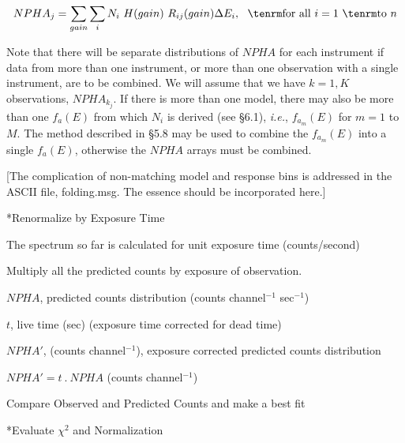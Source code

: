 $$NPHA_j = \sum_{gain} \sum_{i} N_i~H(gain)~R_{ij}(gain) \Delta E_i, ~~{\rm
for~all}~i=1~{\rm to}~n$$

{\list

Note that there will be separate distributions of $NPHA$ for each
instrument if data from more than one instrument, or more than one
observation with a single instrument, are to be combined.
We will assume that we have $k=1,K$ observations, $NPHA_{k_j}$.
If there is more than one model, there may also be more than one
$f_a(E)$ from which $N_i$ is derived (see \S 6.1), {\it i.e.},
$f_{a_m}(E)$ for $m=1$ to $M$.  The method described in \S5.8 may be used to combine
the $f_{a_m}(E)$ into a single $f_a(E)$, otherwise the
$NPHA$ arrays must be combined.

[The complication of non-matching model and response bins is addressed in the ASCII
file, folding.msg. The essence should be incorporated here.]

}

\**Renormalize by Exposure Time
 
{\list


The spectrum so far is calculated for unit exposure time (counts/second)
 
Multiply all the predicted counts by exposure of observation.

 
$NPHA$, predicted counts distribution (counts channel$^{-1}$ sec$^{-1}$)

$t$, live time (sec) (exposure time corrected for dead time)

 
$NPHA'$, (counts channel$^{-1}$), exposure corrected predicted counts distribution


$NPHA' = t~.~NPHA$ (counts channel$^{-1}$)

}
 
\@{Compare Observed and Predicted Counts and make a best fit} 
 
\**Evaluate $\chi^{2}$ and Normalization

